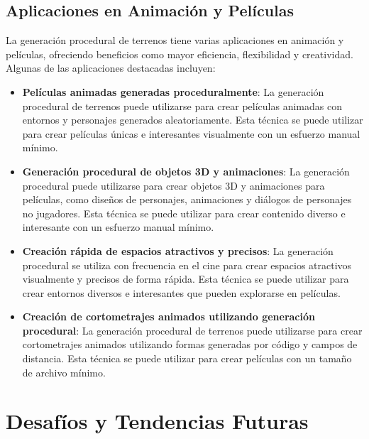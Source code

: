 \subsection{Aplicaciones en Animación y Películas}

La generación procedural de terrenos tiene varias aplicaciones en animación y películas, ofreciendo beneficios como mayor eficiencia, flexibilidad y creatividad. Algunas de las aplicaciones destacadas incluyen:

\begin{itemize}
    \item \textbf{Películas animadas generadas proceduralmente}: La generación procedural de terrenos puede utilizarse para crear películas animadas con entornos y personajes generados aleatoriamente. Esta técnica se puede utilizar para crear películas únicas e interesantes visualmente con un esfuerzo manual mínimo\cite{ProcedurallyGeneratedAnimatedFilms}.
    
    \item \textbf{Generación procedural de objetos 3D y animaciones}: La generación procedural puede utilizarse para crear objetos 3D y animaciones para películas, como diseños de personajes, animaciones y diálogos de personajes no jugadores. Esta técnica se puede utilizar para crear contenido diverso e interesante con un esfuerzo manual mínimo\cite{ProceduralGeneration3DObjects}.
    
    \item \textbf{Creación rápida de espacios atractivos y precisos}: La generación procedural se utiliza con frecuencia en el cine para crear espacios atractivos visualmente y precisos de forma rápida. Esta técnica se puede utilizar para crear entornos diversos e interesantes que pueden explorarse en películas\cite{CreatingVisuallyInterestingSpaces}.
    
    \item \textbf{Creación de cortometrajes animados utilizando generación procedural}: La generación procedural de terrenos puede utilizarse para crear cortometrajes animados utilizando formas generadas por código y campos de distancia. Esta técnica se puede utilizar para crear películas con un tamaño de archivo mínimo\cite{ShortAnimatedMoviesProceduralGeneration}.
\end{itemize}

\section{Desafíos y Tendencias Futuras}

